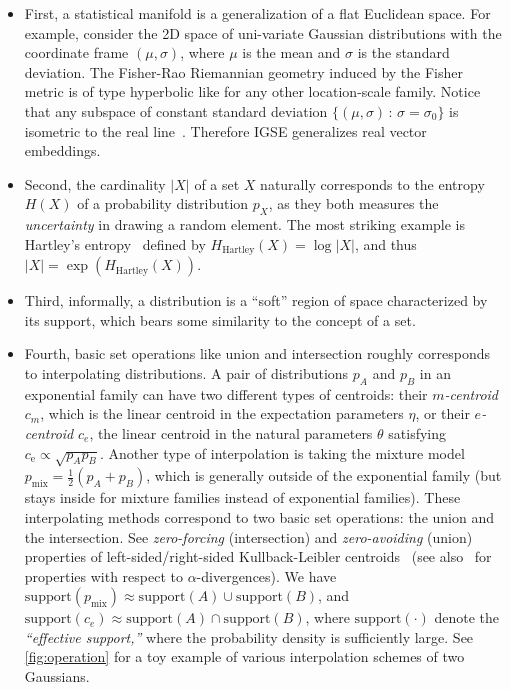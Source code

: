\documentclass{article}
\begin{document}
\begin{itemize}

\item First, a statistical manifold
is a generalization of a flat Euclidean space. For example, consider the 2D space of
uni-variate Gaussian distributions with the coordinate frame
$(\mu,\sigma)$, where $\mu$ is the mean and $\sigma$ is the standard deviation.
The Fisher-Rao Riemannian geometry induced by the Fisher metric is of type hyperbolic like for any other location-scale family.
Notice that any subspace of constant standard deviation $\{(\mu,\sigma)\,:\,\sigma=\sigma_0\}$ is isometric to the real line~\cite{fimgauss}.
Therefore IGSE generalizes real vector embeddings.

\item Second, the cardinality $\vert{}X\vert$ of
a set $X$ naturally corresponds to the entropy $H(X)$ of a probability distribution $p_X$,
as they both measures the {\em uncertainty} in drawing a random element.
The most striking example is Hartley's entropy~\cite{hartley} defined by
$H_{\mathrm{Hartley}}(X)=\log\vert{X}\vert$, and thus $|X|=\exp\left(H_{\mathrm{Hartley}}(X)\right)$.

\item Third, informally, a distribution is a
``soft'' region of space characterized by its support, which bears some similarity to the concept of a set.

\item Fourth, basic set operations like union and intersection roughly corresponds to interpolating distributions.
A pair of distributions $p_A$ and $p_B$ in an exponential family can have
two different types of centroids: their {\em $m$-centroid} $c_m$, which is the linear
centroid in the expectation parameters $\eta$, or their {\em $e$-centroid} $c_e$, the
linear centroid in the natural parameters $\theta$ satisfying $c_\text{e}\propto\sqrt{p_Ap_B}$.
Another type of interpolation is taking the mixture model $p_\text{mix}=\frac{1}{2}(p_A+p_B)$,
which is generally outside of the exponential family (but stays inside for mixture families instead of exponential families).
These interpolating methods correspond to two basic set operations:
the union and the intersection. See {\em zero-forcing} (intersection) and {\em zero-avoiding} (union) properties
of left-sided/right-sided Kullback-Leibler centroids~\cite{symBD-2009} (see also~\cite{minka-2005} for properties with respect to $\alpha$-divergences).
We have $\mathrm{support}(p_\text{mix})\approx\mathrm{support}(A)\cup\mathrm{support}(B)$,
and $\mathrm{support}(c_e)\approx\mathrm{support}(A)\cap\mathrm{support}(B)$,
where $\mathrm{support}(\cdot)$ denote the {\em ``effective support,''} where the probability
density is sufficiently large.
See \cref{fig:operation} for a toy example of various interpolation schemes of two Gaussians.
\end{itemize}
\end{document}
